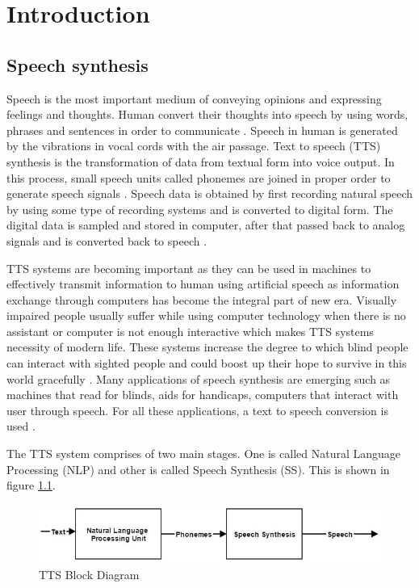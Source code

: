 \chapter{Introduction}

\section{Speech synthesis}

Speech is the most important medium of conveying opinions and expressing feelings and thoughts.
Human convert their thoughts into speech by using words, phrases and sentences in order to communicate \cite{mumtaz2016break}. 
Speech in human is generated by the vibrations in vocal cords with the air passage. Text to speech (TTS) synthesis is the transformation of data from textual form into voice output. In this process, small speech units called phonemes are joined in proper order to generate speech signals \cite{khilari2015review}. Speech data is obtained by first recording natural speech by using some type of recording systems and is converted to digital form. The digital data is sampled and stored in computer, after that passed back to analog signals and is converted back to speech \cite{greene1986perception}. 

TTS systems are becoming important as they can be used in machines to effectively transmit
information to human using artificial speech as information exchange through computers has become the integral part of new
era. Visually impaired people usually suffer while using computer technology when there is no assistant or
computer is not enough interactive which makes TTS systems necessity of modern life. These
systems increase the degree to which blind people can interact with sighted people \cite{klatt1987review} and could boost up
their hope to survive in this world gracefully \cite{aida2010main}. Many applications of speech synthesis are emerging such as 
machines that read for blinds, aids for handicaps, computers that interact with user through speech. 
For all these applications, a text to speech conversion is used \cite{klatt1982klattalk}.

The TTS system comprises of two main stages. One is called Natural Language Processing (NLP) and
other is called Speech Synthesis (SS). This is shown in figure \ref{fig:TTS Block Diagram}.

\begin{figure}
  \centering
  \includegraphics[width=\linewidth]{images/tts_bd.jpg}
  \caption{TTS Block Diagram}
  \label{fig:TTS Block Diagram}
\end{figure}

